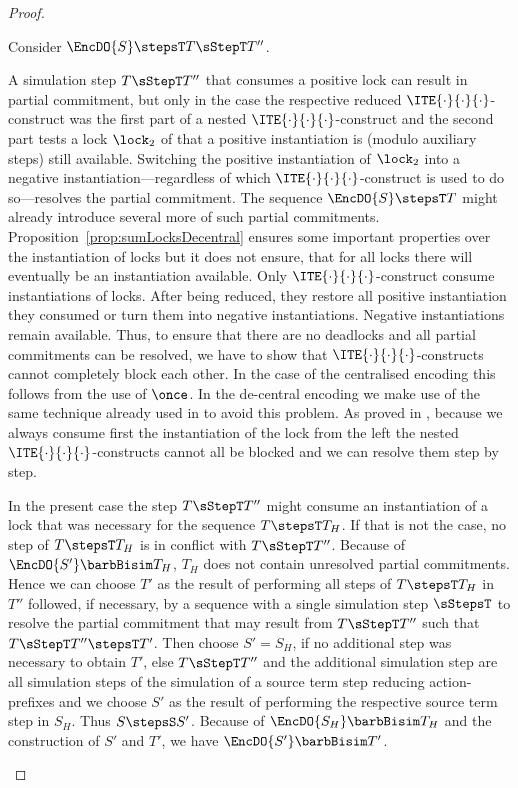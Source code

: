\documentclass[]{eptcs}
\begin{document}
\begin{proof}
\begin{compactitem}
			Consider $ \EncDO{S} \stepsT T \sStepT T'' $.
			\begin{compactenum}
				\item A simulation step $ T \sStepT T'' $ that consumes a positive lock can result in partial commitment, but only in the case the respective reduced $ \ITE{\cdot}{\cdot}{\cdot} $-construct was the first part of a nested $ \ITE{\cdot}{\cdot}{\cdot} $-construct and the second part tests a lock $ \lock_2 $ of that a positive instantiation is (modulo auxiliary steps) still available. Switching the positive instantiation of $ \lock_2 $ into a negative instantiation---regardless of which $ \ITE{\cdot}{\cdot}{\cdot} $-construct is used to do so---resolves the partial commitment. The sequence $ \EncDO{S} \stepsT T $ might already introduce several more of such partial commitments. Proposition~\ref{prop:sumLocksDecentral} ensures some important properties over the instantiation of locks but it does not ensure, that for all locks there will eventually be an instantiation available. Only $ \ITE{\cdot}{\cdot}{\cdot} $-construct consume instantiations of locks. After being reduced, they restore all positive instantiation they consumed or turn them into negative instantiations. Negative instantiations remain available. Thus, to ensure that there are no deadlocks and all partial commitments can be resolved, we have to show that $ \ITE{\cdot}{\cdot}{\cdot} $-constructs cannot completely block each other. In the case of the centralised encoding this follows from the use of $ \once $. In the de-central encoding we make use of the same technique already used in \cite{peters12, petersNestmann15} to avoid this problem. As proved in \cite{peters12}, because we always consume first the instantiation of the lock from the left the nested $ \ITE{\cdot}{\cdot}{\cdot} $-constructs cannot all be blocked and we can resolve them step by step.
					
					In the present case the step $ T \sStepT T'' $ might consume an instantiation of a lock that was necessary for the sequence $ T \stepsT T_H $. If that is not the case, no step of $ T \stepsT T_H $ is in conflict with $ T \sStepT T'' $. Because of $ \EncDO{S'} \barbBisim T_H $, $ T_H $ does not contain unresolved partial commitments. Hence we can choose $ T' $ as the result of performing all steps of $ T \stepsT T_H $ in $ T'' $ followed, if necessary, by a sequence with a single simulation step $ \sStepsT $ to resolve the partial commitment that may result from $ T \sStepT T'' $ such that $ T \sStepT T'' \stepsT T' $. Then choose $ S' = S_H $, if no additional step was necessary to obtain $ T' $, else $ T \sStepT T'' $ and the additional simulation step are all simulation steps of the simulation of a source term step reducing action-prefixes and we choose $ S' $ as the result of performing the respective source term step in $ S_H $. Thus $ S \stepsS S' $. Because of $ \EncDO{S_H} \barbBisim T_H $ and the construction of $ S' $ and $ T' $, we have $ \EncDO{S'} \barbBisim T' $.
					

\end{compactenum}
\end{compactitem}
\end{proof}
\end{document}
